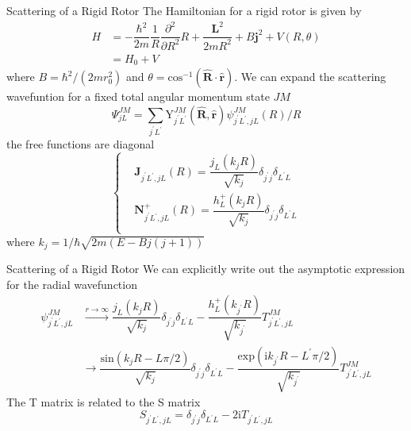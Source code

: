\documentclass{beamer}
\begin{document}
	\begin{frame}{Scattering of a Rigid Rotor}
		The Hamiltonian for a rigid rotor is given by
		\begin{align}
			H&=-\dfrac{\hbar^2}{2m}\dfrac{1}{R}\dfrac{\partial^2}{\partial R^2}R+\dfrac{\mathbf{L}^2}{2mR^2}+B\mathbf{j}^2+V(R,\theta)\nonumber\\
			&=H_0+V
		\end{align}
		where $B=\hbar^2/(2mr^2_0)$ and $\theta=\mathrm{cos}^{-1}(\hat{\mathbf{R}}\cdot\hat{\mathbf{r}})$. We can expand the scattering wavefuntion for a fixed total angular momentum state $JM$
		\begin{equation}
			\Psi^{JM}_{jL}=\sum\limits_{j^\prime L^\prime}\mathrm{Y}^{JM}_{j^\prime L^\prime}(\hat{\mathbf{R}},\hat{\mathbf{r}})\psi^{JM}_{j^\prime L^\prime,jL}(R)/R
		\end{equation}
		the free functions are diagonal
		\begin{equation}
			\left\{
			\begin{aligned}
				&\mathbf{J}_{j^\prime L^\prime,jL}(R)=\dfrac{j_L(k_jR)}{\sqrt{k_j}}\delta_{j^\prime j}\delta_{L^\prime L}\\
				&\mathbf{N}^+_{j^\prime L^\prime,jL}(R)=\dfrac{h^+_L(k_jR)}{\sqrt{k_j}}\delta_{j^\prime j}\delta_{L^\prime L}\\
			\end{aligned}
			\right
			.
		\end{equation}
	where $k_j=1/\hbar\sqrt{2m(E-Bj(j+1))}$	
	\end{frame}
	\begin{frame}{Scattering of a Rigid Rotor}
		We can explicitly write out the asymptotic expression for the radial wavefunction
		\begin{align}
			\psi^{JM}_{j^\prime L^\prime,jL}&\stackrel{r\rightarrow\infty}{\longrightarrow}\dfrac{j_L(k_jR)}{\sqrt{k_j}}\delta_{j^\prime j}\delta_{L^\prime L}-\dfrac{h^+_L(k_{j^\prime}R)}{\sqrt{k_{j^\prime}}}T^{JM}_{j^\prime L^\prime,jL}\nonumber\\
			&\longrightarrow\dfrac{\mathrm{sin}(k_jR-L\pi/2)}{\sqrt{k_j}}\delta_{j^\prime j}\delta_{L^\prime L}-\dfrac{\mathrm{exp}(\mathrm{i}k_{j^\prime}R-L^\prime\pi/2)}{\sqrt{k_{j^\prime}}}T^{JM}_{j^\prime L^\prime,jL}
		\end{align}
		The T matrix is related to the S matrix
		\begin{equation}
			S_{j^\prime L^\prime,jL}=\delta_{j^\prime j}\delta_{L^\prime L}-2\mathrm{i}T_{j^\prime L^\prime,jL}
		\end{equation}
	\end{frame}
\end{document}
